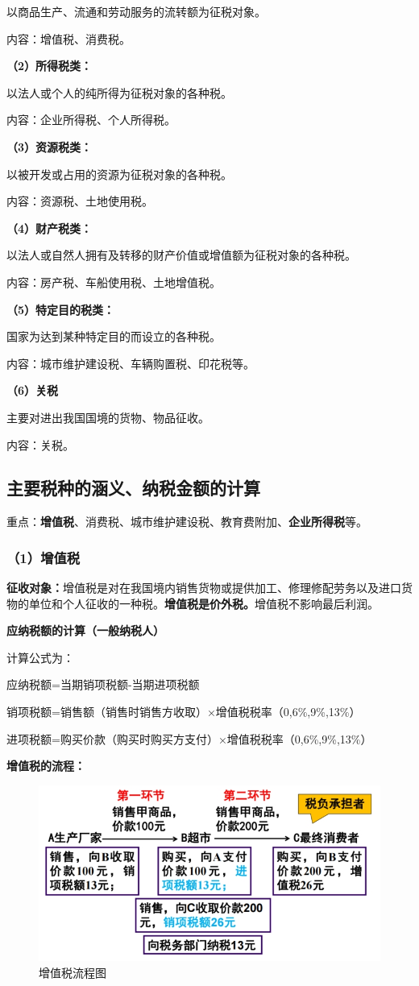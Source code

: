以商品生产、流通和劳动服务的流转额为征税对象。

内容：增值税、消费税。

\textbf{（2）所得税类：}

以法人或个人的纯所得为征税对象的各种税。

内容：企业所得税、个人所得税。

\textbf{（3）资源税类：}

以被开发或占用的资源为征税对象的各种税。

内容：资源税、土地使用税。

\textbf{（4）财产税类：}

以法人或自然人拥有及转移的财产价值或增值额为征税对象的各种税。

内容：房产税、车船使用税、土地增值税。

\textbf{（5）特定目的税类：}

国家为达到某种特定目的而设立的各种税。

内容：城市维护建设税、车辆购置税、印花税等。

\textbf{（6）关税}

主要对进出我国国境的货物、物品征收。

内容：关税。

\subsection{主要税种的涵义、纳税金额的计算}
重点：\textbf{增值税}、消费税、城市维护建设税、教育费附加、\textbf{企业所得税}等。

\subsubsection{（1）增值税}
\textbf{征收对象：}增值税是对在我国境内销售货物或提供加工、修理修配劳务以及进口货物的单位和个人征收的一种税。\textbf{增值税是价外税。}增值税不影响最后利润。

\textbf{应纳税额的计算（一般纳税人）}

计算公式为：

应纳税额=当期销项税额-当期进项税额

销项税额=销售额（销售时销售方收取）×增值税税率（0,6\%,9\%,13\%）

进项税额=购买价款（购买时购买方支付）×增值税税率（0,6\%,9\%,13\%）

\textbf{增值税的流程：}
\begin{figure}[H]
    \centering
    \includegraphics[width=\textwidth]{image/增值税流程图.png}
    \caption{增值税流程图}
\end{figure}

